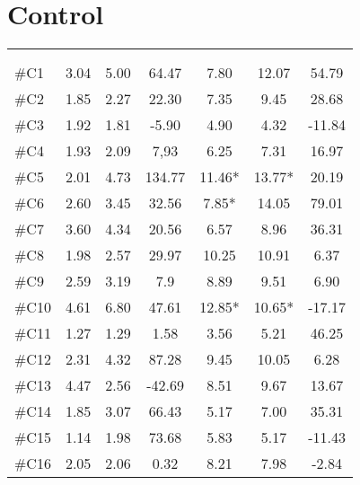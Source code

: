 \section{Control}
\begin{longtable} {l|c|c|c|c|c|c}
 \rowcolor[HTML]{C0C0C0} 
  \color[HTML]{000000}{} & 
 \multicolumn{3}{c|}{ \color[HTML]{000000}{\textbf{Threshold}}} & \multicolumn{3}{c}{ \color[HTML]{000000}{\textbf{Tolerance}}}  	\\  \rule{0pt}{3ex} 
  \cellcolor[HTML]{C0C0C0}{} &
 \multicolumn{1}{c|}{ \cellcolor[HTML]{C0C0C0}{Pre [KgF]}} & \multicolumn{1}{c|}{ \cellcolor[HTML]{C0C0C0}{Post [KgF]}} 
 & \multicolumn{1}{c}{ \cellcolor[HTML]{C0C0C0}{\textcolor[HTML]{C0C0C0}{0}Diff [\%]\textcolor[HTML]{C0C0C0}{0}}}
 & \multicolumn{1}{|c|}{ \cellcolor[HTML]{C0C0C0}{Pre [KgF]}} 
 & \multicolumn{1}{c|}{ \cellcolor[HTML]{C0C0C0}{Post [KgF]}} 
 & \multicolumn{1}{c}{ \cellcolor[HTML]{C0C0C0}{\textcolor[HTML]{C0C0C0}{0}Diff [\%]\textcolor[HTML]{C0C0C0}{0}}}  	\\ \hline   
\#C1 & 3.04	& 5.00	&	64.47	& 7.80	& 	12.07 &	54.79\\ \hline
\#C2 & 1.85 	& 2.27	&	22.30	& 7.35	& 	9.45 & 28.68	\\ \hline
\#C3 & 1.92 	& 1.81	&	-5.90	& 4.90	& 	4.32 & -11.84	\\ \hline
\#C4 & 1.93 	& 2.09	&	7,93		& 6.25	&	7.31 & 16.97	\\ \hline
\#C5 & 2.01 	& 4.73 	& 	134.77	& 11.46* 	& 13.77* & 20.19		\\ \hline
\#C6 & 2.60 	& 3.45	& 	32.56		& 7.85*	& 14.05 & 79.01		\\ \hline	
\#C7 & 3.60 & 4.34	& 	20.56		& 6.57 & 8.96  &	36.31 \\ \hline
\#C8 & 1.98 & 2.57	& 	29.97		& 10.25	& 10.91 &	6.37	\\ \hline
\#C9 & 2.59 & 3.19 	& 	7.9		& 8.89	& 9.51 & 6.90		\\ \hline
\#C10 & 4.61 & 6.80	& 	47.61		& 12.85*	& 10.65* & -17.17 \\ \hline
\#C11 & 1.27 & 1.29 	& 	1.58		& 3.56	& 5.21 &  46.25\\ \hline
\#C12 & 2.31 & 4.32 	& 	87.28	& 9.45 & 10.05 & 6.28 \\ \hline
\#C13 & 4.47 & 2.56 	& 	-42.69	& 8.51 & 9.67 & 13.67 \\ \hline
\#C14 & 1.85 & 3.07 & 	66.43	 & 5.17 & 7.00 & 35.31 \\ \hline
\#C15 & 1.14 & 1.98 & 	73.68 & 5.83 & 5.17 & -11.43 \\ \hline
\#C16 & 2.05 & 2.06 & 	0.32 & 8.21 & 7.98 & -2.84 \\ \hline

\end{longtable}
